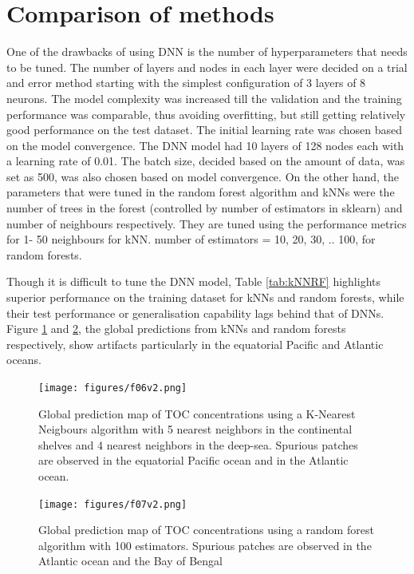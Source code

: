 \documentclass[journal abbreviation, manuscript]{copernicus}
\begin{document}
\section{Comparison of methods}
\label{appendix:kNNRF}
One of the drawbacks of using DNN is the number of hyperparameters that needs to be tuned. The number of layers and nodes in each layer were decided on a trial and error method starting with the simplest configuration of 3 layers of 8 neurons. The model complexity was increased till the validation and the training performance was comparable, thus avoiding overfitting, but still getting relatively good performance on the test dataset. The initial learning rate was chosen based on the model convergence. The DNN model had 10 layers of 128 nodes each with a learning rate of 0.01. The batch size, decided based on the amount of data, was set as 500, was also chosen based on model convergence. On the other hand, the parameters that were tuned in the random forest algorithm and kNNs were the number of trees in the forest (controlled by number of estimators in sklearn) and number of neighbours respectively. They are tuned using the performance metrics for 1- 50 neighbours for kNN. number of estimators = 10, 20, 30, .. 100, for random forests. 

Though it is difficult to tune the DNN model, Table \ref{tab:kNNRF} highlights superior performance on the training dataset for kNNs and random forests, while their test performance or generalisation capability lags behind that of DNNs. Figure \ref{fig:tocPercent_kNN} and \ref{fig:tocPercent_RF}, the global predictions from kNNs and random forests respectively, show artifacts particularly in the equatorial Pacific and Atlantic oceans. 

\begin{figure}[!htb]
    \centering
    \texttt{[image: figures/f06v2.png]}
    \caption{Global prediction map of TOC concentrations using a K-Nearest Neigbours algorithm with 5 nearest neighbors in the continental shelves and 4 nearest neighbors in the deep-sea. Spurious patches are observed in the equatorial Pacific ocean and in the Atlantic ocean.}%
    \label{fig:tocPercent_kNN}
\end{figure}

\begin{figure}[!htb]
    \centering
    \texttt{[image: figures/f07v2.png]}
    \caption{Global prediction map of TOC concentrations using a random forest algorithm with 100 estimators. Spurious patches are observed in the Atlantic ocean and the Bay of Bengal}%
    \label{fig:tocPercent_RF}
\end{figure}
\end{document}
